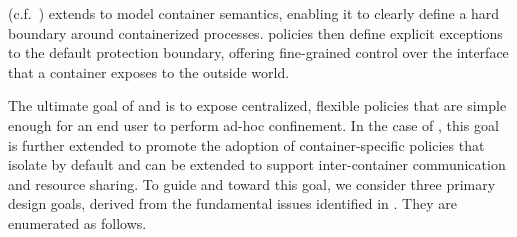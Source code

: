 \bpfcontain{} (c.f.\ ) extends \bpfbox{} to model container semantics,
enabling it to clearly define a hard boundary around containerized processes.
\bpfcontain{} policies then define explicit exceptions to the default protection boundary,
offering fine-grained control over the interface that a container exposes to the outside
world.

The ultimate goal of \bpfbox{} and \bpfcontain{} is to expose centralized, flexible
policies that are simple enough for an end user to perform ad-hoc confinement. In the case
of \bpfcontain{}, this goal is further extended to promote the adoption of
container-specific policies that isolate by default and can be extended to support
inter-container communication and resource sharing. To guide \bpfbox{} and \bpfcontain{}
toward this goal, we consider three primary design goals, derived from the fundamental
issues identified in . They are enumerated as follows.



